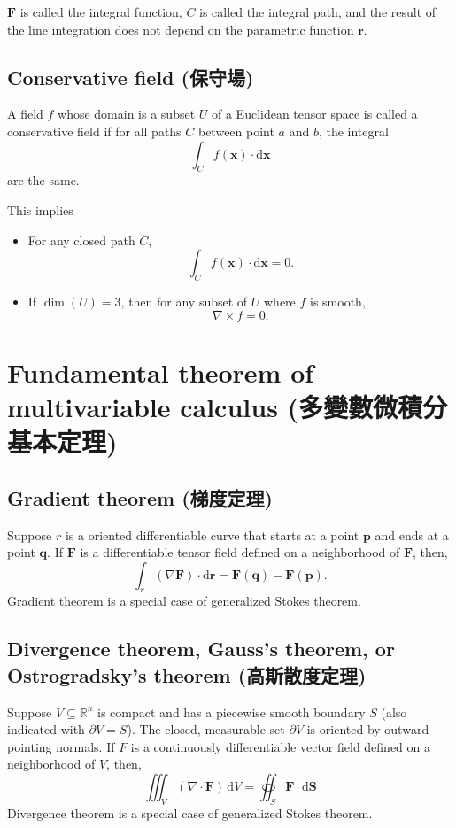 \documentclass[a4paper,12pt]{report}
\begin{document}
$\mathbf{F}$ is called the integral function, $C$ is called the integral path, and the result of the line integration does not depend on the parametric function $\mathbf{r}$.
\subsection{Conservative field (保守場)}
A field $f$ whose domain is a subset $U$ of a Euclidean tensor space is called a conservative field if for all paths $C$ between point $a$ and $b$, the integral 
\[\int_Cf(\mathbf{x})\cdot\mathrm{d}\mathbf{x}\]
are the same.

This implies 
\begin{itemize}
\item For any closed path $C$, 
\[\int_Cf(\mathbf{x})\cdot\mathrm{d}\mathbf{x}=0.\]
\item If $\operatorname{dim}(U)=3$, then for any subset of $U$ where $f$ is smooth,
\[\nabla\times f=0.\]
\end{itemize}



\section{Fundamental theorem of multivariable calculus (多變數微積分基本定理)}
\subsection{Gradient theorem (梯度定理)}
Suppose $r$ is a oriented differentiable curve that starts at a point $\mathbf{p}$ and ends at a point $\mathbf{q}$. If $\mathbf{F}$ is a differentiable tensor field defined on a neighborhood of $\mathbf{F}$, then,
\[\int_r(\nabla\mathbf{F})\cdot\mathrm{d}\mathbf{r}=\mathbf{F}\left(\mathbf{q}\right)-\mathbf{F}\left(\mathbf{p}\right).\]
Gradient theorem is a special case of generalized Stokes theorem.
\subsection{Divergence theorem, Gauss's theorem, or Ostrogradsky's theorem (高斯散度定理)}
Suppose $V\subseteq\mathbb{R}^n$ is compact and has a piecewise smooth boundary $S$ (also indicated with $\partial V=S$). The closed, measurable set $\partial V$ is oriented by outward-pointing normals. If $F$ is a continuously differentiable vector field defined on a neighborhood of $V$, then,
\[\iiint_V\left(\nabla\cdot\mathbf {F}\right)\,\mathrm{d}V=\oiint_S\mathbf{F}\cdot\mathrm{d}\mathbf{S}\]
Divergence theorem is a special case of generalized Stokes theorem.
\end{document}
